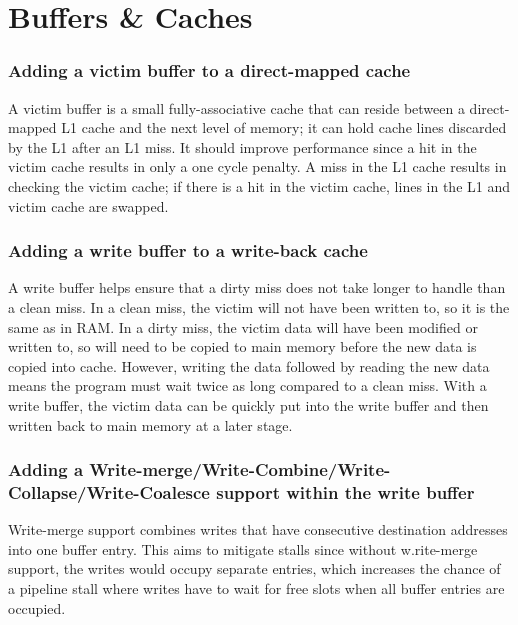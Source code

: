 \documentclass[a4paper, 12pt, oneside]{book}
\begin{document}
\section{Buffers \& Caches}

\subsubsection{Adding a victim buffer to a direct-mapped cache}

A victim buffer is a small fully-associative cache that can reside between a direct-mapped L1 cache and the next level of memory; it can hold cache lines discarded by the L1 after an L1 miss. It should improve performance since a hit in the victim cache results in only a one cycle penalty. A miss in the L1 cache results in checking the victim cache; if there is a hit in the victim cache, lines in the L1 and victim cache are swapped.

\subsubsection{Adding a write buffer to a write-back cache}

A write buffer helps ensure that a dirty miss does not take longer to handle than a clean miss. In a clean miss, the victim will not have been written to, so it is the same as in RAM. In a dirty miss, the victim data will have been modified or written to, so will need to be copied to main memory before the new data is copied into cache. However, writing the data followed by reading the new data means the program must wait twice as long compared to a clean miss. With a write buffer, the victim data can be quickly put into the write buffer and then written back to main memory at a later stage.

\subsubsection{Adding a Write-merge/Write-Combine/Write-Collapse/Write-Coalesce support within the write buffer}

Write-merge support combines writes that have consecutive destination addresses into one buffer entry. This aims to mitigate stalls since without w.rite-merge support, the writes would occupy separate entries, which increases the chance of a pipeline stall where writes have to wait for free slots when all buffer entries are occupied.\\
\end{document}
